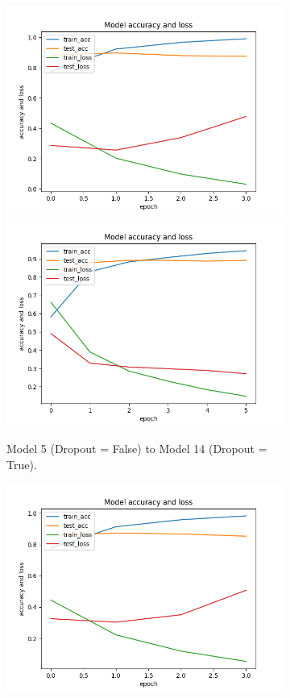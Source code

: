 \documentclass[11pt]{article}
\begin{document}
\begin{figure}[h!]
\begin{subfigure}{0.35\textwidth}
         \includegraphics[width=\textwidth]{model5.png}
\includegraphics[width=\textwidth]{model14.png}
         \caption{Model 5 (Dropout = False) to Model 14 (Dropout = True).}
         \label{fig:dropout2}
\end{subfigure}
\hfill
\begin{subfigure}{0.35\textwidth}
         \centering
         \includegraphics[width=\textwidth]{model17.png}

\end{subfigure}
\end{figure}
\end{document}
